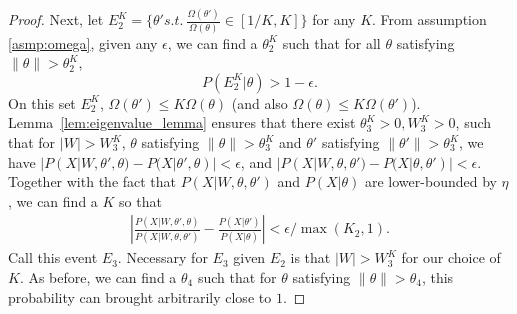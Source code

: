 \begin{proof}
Next, let $E^K_2 = \{\theta' s.t.\ \frac{\Omega(\theta')}{\Omega(\theta)}
\in [1/K,K] \}$ for any $K$. From assumption \ref{asmp:omega}, given any
$\epsilon$, we can find a $\theta^K_2$ such that for all $\theta$ satisfying $\parallel \theta \parallel > \theta^K_2$,
$$P(E^K_2 | \theta) > 1 - \epsilon .$$
On this set $E^K_2$, $\Omega(\theta') \le K \Omega(\theta)$ (and also
$\Omega(\theta) \le K \Omega(\theta')$).  Lemma~\ref{lem:eigenvalue_lemma}
ensures that %
there exist $\theta^K_3 > 0, W^K_3 > 0$, such that for $|W| > W^K_3$,
$\theta$ satisfying $ \parallel \theta \parallel > \theta^K_3$ and $\theta'$ satisfying $ \parallel \theta' \parallel > \theta^K_3$, we have
$|P(X | W, \theta' , \theta) - P(X | \theta' , \theta)| < \epsilon$, and
$|P(X | W, \theta , \theta') - P(X | \theta , \theta')| < \epsilon$.
Together with the fact that ${P(X | W, \theta , \theta')}$ and ${P(X | \theta)}$
are lower-bounded by $\eta$,
we can find a $K$ so that
\begin{align*}
|\frac{P(X | W, \theta' , \theta)}{P(X | W, \theta , \theta')} - \frac{P(X | \theta')}{P(X | \theta)}| < \epsilon / \max(K_2, 1).
\end{align*}
Call this event $E_3$. Necessary for $E_3$ given $E_2$ is that
$|W| > W^K_3$ for our choice of $K$. As before, we can find a $\theta_4$
such that for $\theta$ satisfying $ \parallel \theta \parallel  > \theta_4$, this probability can brought arbitrarily close to $1$.




\end{proof}
